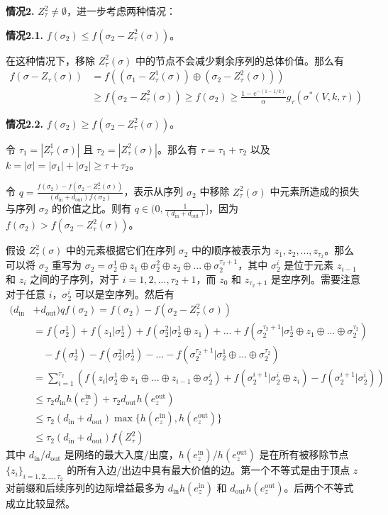 \textbf{情况2.} $Z^2_{\tau} \neq \emptyset$，进一步考虑两种情况：

\textbf{情况2.1.} $f(\sigma_2) \le f(\sigma_2 - Z^2_\tau(\sigma))$。

在这种情况下，移除 $Z^2_\tau(\sigma)$ 中的节点不会减少剩余序列的总体价值。那么有
\begin{align}
f(\sigma-Z_\tau(\sigma)) & = f((\sigma_1 - Z_\tau^1(\sigma)) \oplus (\sigma_2 - Z_\tau^2(\sigma))) \\
& \ge f(\sigma_2 -Z_\tau^2(\sigma)) \ge f(\sigma_2) \ge \frac{1-e^{-(1-1/k)}}{\alpha} g_\tau(\sigma^*(V,k,\tau))
\end{align}

\textbf{情况2.2.}  $f(\sigma_2) \ge f(\sigma_2 - Z^2_\tau(\sigma))$。

令 $\tau_1 = |Z_\tau^1(\sigma)|$ 且 $\tau_2=|Z_\tau^2(\sigma)|$。那么有 $\tau=\tau_1+\tau_2$ 以及 $k=|\sigma|=|\sigma_1|+|\sigma_2|\ge \tau+\tau_2$。

令 $q= \frac{f(\sigma_2)-f(\sigma_2-Z_\tau^2(\sigma))}{(d_{\text{in}}+d_{\text{out}})f(\sigma_2)}$，表示从序列 $\sigma_2$ 中移除 $Z_\tau^2(\sigma)$ 中元素所造成的损失与序列 $\sigma_2$ 的价值之比。则有 $q\in (0,\frac{1}{(d_{\text{in}}+d_{\text{out}})}]$，因为 $f(\sigma_2) > f(\sigma_2-Z_\tau^2(\sigma))$。

假设 $Z^2_\tau(\sigma)$ 中的元素根据它们在序列 $\sigma_2$ 中的顺序被表示为 $z_1,z_2,...,z_{\tau_2}$。那么可以将 $\sigma_2$ 重写为 $\sigma_2=\sigma_2^1\oplus z_1 \oplus \sigma_2^2 \oplus z_2 \oplus ... \oplus \sigma_2^{\tau_2+1}$，其中 $\sigma_2^i$ 是位于元素 $z_{i-1}$ 和 $z_i$ 之间的子序列，对于 $i=1,2,...,\tau_2+1$，而 $z_0$ 和 $z_{\tau_2+1}$ 是空序列。需要注意对于任意 $i$，$\sigma_2^i$ 可以是空序列。然后有
\begin{align}
(d_{\text{in}} & + d_{\text{out}}) q f(\sigma_2) = f(\sigma_2) - f(\sigma_2-Z_\tau^2(\sigma)) \\
& = f(\sigma_2^1) + f(z_1|\sigma_2^1)+f(\sigma_2^2| \sigma_2^1\oplus z_1) + ... + f(\sigma_2^{\tau_2+1}| \sigma_2^1\oplus z_1 \oplus ... \oplus \sigma_2^{\tau_2}) \nonumber \\
& \quad - f(\sigma_2^1) -f(\sigma_2^2|\sigma_2^1) - ... - f(\sigma_2^{\tau_2+1}| \sigma_2^1\oplus ... \oplus \sigma_2^{\tau_2}) \\
& = \sum_{i=1}^{\tau_2} \left( f(z_i|\sigma_2^1\oplus z_1 \oplus ... \oplus z_{i-1}\oplus \sigma_2^i)+f(\sigma_2^{i+1}|\sigma_2^i\oplus z_i) - f(\sigma_2^{i+1}|\sigma_2^i) \right)\\
& \le \tau_2 d_{\text{in}} h(e_z^{\text{in}}) + \tau_2 d_{\text{out}} h(e_z^{\text{out}}) \\
& \le \tau_2(d_{\text{in}} + d_{\text{out}}) \max \{h(e_z^{\text{in}}),h(e_z^{\text{out}})\} \\
& \le \tau_2(d_{\text{in}} + d_{\text{out}}) f(Z_\tau^2)
\end{align}
\noindent 其中 $d_{\text{in}}$/$d_{\text{out}}$ 是网络的最大入度/出度，$h(e_z^{\text{in}})$/$h(e_z^{\text{out}})$ 是在所有被移除节点 $\{z_i\}_{i=1,2,...,\tau_2}$ 的所有入边/出边中具有最大价值的边。第一个不等式是由于顶点 $z$ 对前缀和后续序列的边际增益最多为 $d_{\text{in}} h(e_z^{\text{in}})$ 和 $d_{\text{out}} h(e_z^{\text{out}})$。后两个不等式成立比较显然。

